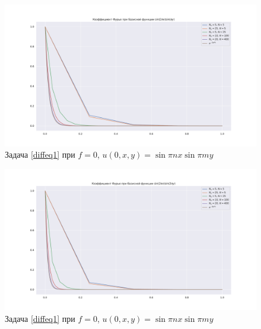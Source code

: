 \documentclass[14pt,a4paper]{extarticle}
\newcommand{\1}{\mathbbm{1}}
\begin{document}
\begin{figure}
    \centering
    \includegraphics[scale=0.4]{figs/21bf_test.pdf}
    \caption{Задача \ref{diffeq1} при $f = 0$, $u(0, x, y) = \sin \pi n x \sin \pi m y$}
    \label{tbf21}
\end{figure}
\begin{figure}
    \centering
    \includegraphics[scale=0.4]{figs/22bf_test.pdf}
    \caption{Задача \ref{diffeq1} при $f = 0$, $u(0, x, y) = \sin \pi n x \sin \pi m y$}
    \label{tbf22}
\end{figure}
\end{document}
